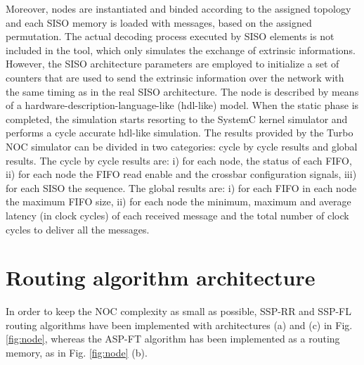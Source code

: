 \documentclass[10pt,twocolumn,journal]{IEEEtran}
\begin{document}
Moreover,  nodes are instantiated and binded according to the assigned topology and each SISO memory is loaded 
with  messages, based on the assigned permutation. 
The actual decoding process executed by SISO elements is not included in the tool, which only simulates the exchange of 
extrinsic informations. However, 
the SISO architecture parameters are employed to initialize a set of counters that are used to send the extrinsic 
information over the network with the same timing as in the real SISO architecture. 
The node is described by means of 
a hardware-description-language-like (hdl-like) model. 
When the static phase is completed, the simulation starts resorting to the SystemC kernel simulator and  
performs a cycle accurate hdl-like simulation.
The results provided by the Turbo NOC simulator can be divided in two categories: 
cycle by cycle results and global results.
The cycle by cycle results are: i) for each node, the status of each FIFO, ii) for each node 
the FIFO read enable and the crossbar configuration signals, iii) for each SISO the  sequence. 
The global results are: i) for each FIFO in each node the maximum FIFO size, ii) for each node the minimum, maximum 
and average latency (in clock cycles) of each received message and the total number of clock cycles to deliver all the 
messages.

\section{Routing algorithm architecture}
\label{sec:routing_algo_arch}

In order to keep the NOC complexity as small as possible, SSP-RR and SSP-FL routing algorithms have been 
implemented with architectures (a) and (c) in Fig. \ref{fig:node}, whereas the ASP-FT algorithm has been implemented 
as a routing memory, as in Fig. \ref{fig:node} (b). 
\end{document}
